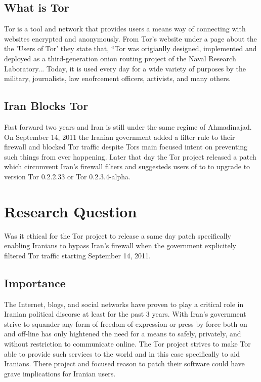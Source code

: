 \documentclass[11pt]{article}
\begin{document}
\begin{multicols}{2}
\subsection{What is Tor}

Tor is a tool and network that provides users a means way of connecting with
websites encrypted and anonymously. From Tor's website under a page about the
the 'Users of Tor' they state that, ``Tor was origianlly designed, implemented
and deployed as a third-generation onion routing project of the Naval Research
Laboratory... Today, it is used every day for a wide variety of purposes by the
military, journalists, law enofrcement officers, activists, and many others.

\subsection{Iran Blocks Tor}

Fast forward two years and Iran is still under the same regime of Ahmadinajad.
On September 14, 2011 the Iranian government added a filter rule to their
firewall and blocked Tor traffic despite Tors main focused intent on preventing
such things from ever happening\cite{IranBlocksTorSameDayFix}.  Later that day
the Tor project released a patch which circumvent Iran's firewall filters and
suggesteds users of to to upgrade to version Tor 0.2.2.33 or Tor
0.2.3.4-alpha\cite{IranBlocksTorSameDayFix}.






\section{Research Question} 
Was it ethical for the Tor project to release a same day patch specifically
enabling Iranians to bypass Iran's firewall when the government explicitely
filtered Tor traffic starting September 14, 2011.

\subsection{Importance}

The Internet, blogs, and social networks have proven to play a critical role in
Iranian political discorse at least for the past 3 years. With Iran's government
strive to squander any form of freedom of expression or press by force both on-
and off-line has only hightened the need for a means to safely, privately, and
without restriction to communicate online. The Tor project strives to make Tor
able to provide such services to the world and in this case specifically to aid
Iranians. There project and focused reason to patch their software could have
grave implications for Iranian users.


\end{multicols}
\end{document}
